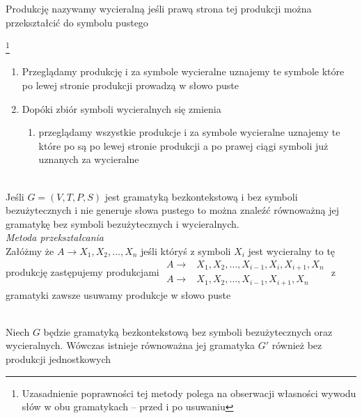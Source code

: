	\begin{df}
		Produkcję nazywamy wycieralną jeśli prawą strona tej produkcji można przekształcić do symbolu pustego
	\end{df}			
	
	\begin{alg}\footnote{Uzasadnienie poprawności tej metody polega na 
	obserwacji własności wywodu słów w obu gramatykach -- przed i po usuwaniu}~\\
		\begin{enumerate}
			\item Przeglądamy produkcję i za symbole wycieralne uznajemy te symbole które po lewej stronie produkcji 
			prowadzą w słowo puste
			\item Dopóki zbiór symboli wycieralnych się zmienia
			\begin{enumerate}
				\item przeglądamy wszystkie produkcje i za symbole wycieralne uznajemy te które po są po lewej stronie
				produkcji a po prawej ciągi symboli już uznanych za wycieralne
			\end{enumerate}
		\end{enumerate}
	\end{alg}
	
	\begin{df}~\\
		Jeśli $G = (V, T, P, S)$ jest gramatyką bezkontekstową i bez symboli bezużytecznych i nie generuje słowa pustego
		to można znaleźć równoważną jej gramatykę bez symboli bezużytecznych i wycieralnych.\\
		\emph{Metoda przekształcania}\\
		Załóżmy że $A \to X_1,X_2,\dots,X_n$ jeśli któryś z symboli $X_i$ jest wycieralny to tę produkcję zastępujemy produkcjami
		$\begin{matrix}
			A \to& X_1,X_2,\dots,X_{i-1},X_i,X_{i+1},X_n \\ A \to& X_1,X_2,\dots,X_{i-1},X_{i+1},X_n
		\end{matrix}$
		z gramatyki zawsze usuwamy produkcje w słowo puste
	\end{df}	
	
	\begin{lemat}~\\
		Niech $G$ będzie gramatyką bezkontekstową bez symboli bezużytecznych oraz wycieralnych. Wówczas 
		istnieje równoważna jej gramatyka $G'$ również bez produkcji jednostkowych
	\end{lemat}
	
